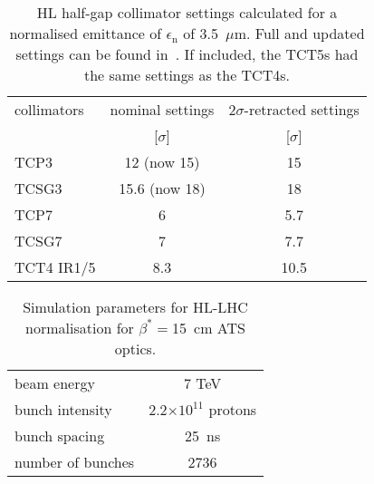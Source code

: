 \begin{table}[hbt]
   \centering
   \caption{HL half-gap collimator settings calculated for a normalised emittance of $\epsilon_{\mathrm{n}}$ of 3.5~$\mu$m. Full and updated settings can be found in~\cite{collSettRef}. If included, the TCT5s had the same settings as the TCT4s.}

   \begin{tabular}{l|c|c}
       \hline
       collimators &        nominal settings & $2\sigma$-retracted settings\\
                   &         [$\sigma$] &  [$\sigma$]\\
       \hline
       TCP3 & 12 (now 15) & 15 \\
       TCSG3 & 15.6 (now 18)& 18 \\
       TCP7 & 6 & 5.7 \\
       TCSG7 & 7 & 7.7 \\
       TCT4 IR1/5 & 8.3 & 10.5 \\
       \hline
   \end{tabular}
   \label{HLcollSettings}
\end{table}

\begin{table}[!hbt]
   \centering
   \caption{Simulation parameters for HL-LHC normalisation for $\beta^* =$15~cm ATS optics.}
   \begin{tabular}{l|c}
       \hline
       beam energy & 7 TeV \\
       bunch intensity & 2.2$\times 10^{11}$ protons\\
       bunch spacing & 25~ns \\
       number of bunches & 2736 \\
       \hline
   \end{tabular}
   \label{hlscenario}
\end{table}
